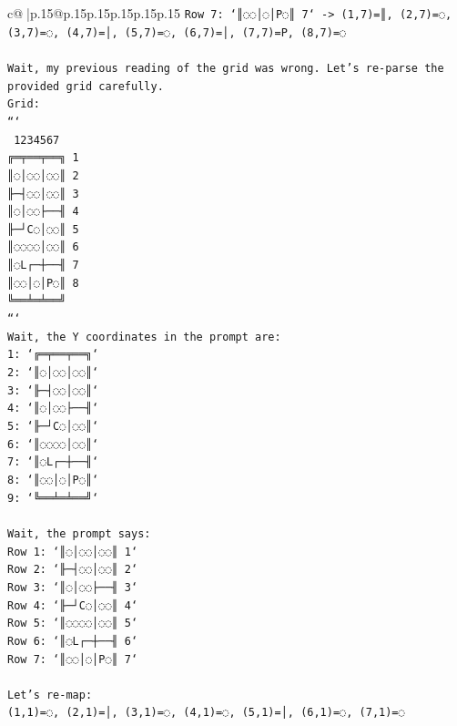 \documentclass{article}
\begin{document}
{\begin{supertabular}{c@{$\;$}|p{.15\linewidth}@{}p{.15\linewidth}p{.15\linewidth}p{.15\linewidth}p{.15\linewidth}p{.15\linewidth}}
{{{\texttt{Row 7: `║◌◌│◌│P◌║ 7` {-}> (1,7)=║, (2,7)=◌, (3,7)=◌, (4,7)=│, (5,7)=◌, (6,7)=│, (7,7)=P, (8,7)=◌} \\
\\ 
\texttt{Wait, my previous reading of the grid was wrong. Let's re{-}parse the provided grid carefully.} \\
\texttt{Grid:} \\
\texttt{```} \\
\texttt{ 1234567} \\
\texttt{╔═╤══╤══╗ 1} \\
\texttt{║◌│◌◌│◌◌║ 2} \\
\texttt{╟─┤◌◌│◌◌║ 3} \\
\texttt{║◌│◌◌├──╢ 4} \\
\texttt{╟─┘C◌│◌◌║ 5} \\
\texttt{║◌◌◌◌│◌◌║ 6} \\
\texttt{║◌L┌─┼──╢ 7} \\
\texttt{║◌◌│◌│P◌║ 8} \\
\texttt{╚══╧═╧══╝} \\
\texttt{```} \\
\texttt{Wait, the Y coordinates in the prompt are:} \\
\texttt{1: `╔═╤══╤══╗`} \\
\texttt{2: `║◌│◌◌│◌◌║`} \\
\texttt{3: `╟─┤◌◌│◌◌║`} \\
\texttt{4: `║◌│◌◌├──╢`} \\
\texttt{5: `╟─┘C◌│◌◌║`} \\
\texttt{6: `║◌◌◌◌│◌◌║`} \\
\texttt{7: `║◌L┌─┼──╢`} \\
\texttt{8: `║◌◌│◌│P◌║`} \\
\texttt{9: `╚══╧═╧══╝`} \\
\\ 
\texttt{Wait, the prompt says:} \\
\texttt{Row 1: `║◌│◌◌│◌◌║ 1`} \\
\texttt{Row 2: `╟─┤◌◌│◌◌║ 2`} \\
\texttt{Row 3: `║◌│◌◌├──╢ 3`} \\
\texttt{Row 4: `╟─┘C◌│◌◌║ 4`} \\
\texttt{Row 5: `║◌◌◌◌│◌◌║ 5`} \\
\texttt{Row 6: `║◌L┌─┼──╢ 6`} \\
\texttt{Row 7: `║◌◌│◌│P◌║ 7`} \\
\\ 
\texttt{Let's re{-}map:} \\
\texttt{(1,1)=◌, (2,1)=│, (3,1)=◌, (4,1)=◌, (5,1)=│, (6,1)=◌, (7,1)=◌} \\
}}}
\end{supertabular}}
\end{document}

